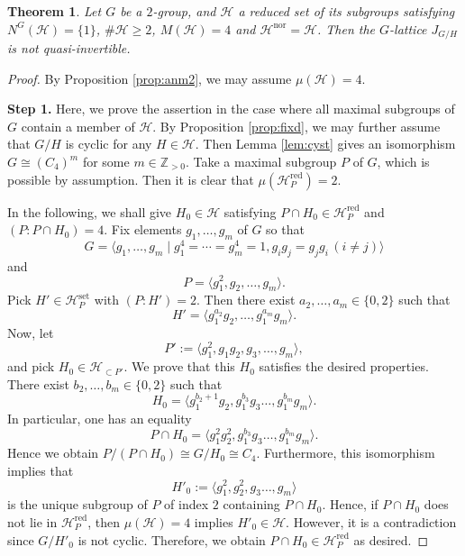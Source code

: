 \documentclass[12pt]{amsart}
\theoremstyle{plain}
\newtheorem{thm}{Theorem}[section]
\theoremstyle{definition}
\numberwithin{thm}{section}
\numberwithin{equation}{section}
\newcommand{\Zpn}{\mathbb{Z}_{>0}}
\newcommand{\cH}{\mathcal{H}}
\DeclareMathOperator{\red}{red}
\DeclareMathOperator{\nor}{nor}
\DeclareMathOperator{\set}{set}
\begin{document}
\begin{thm}\label{thm:ind2}
Let $G$ be a $2$-group, and $\cH$ a reduced set of its subgroups satisfying $N^{G}(\cH)=\{1\}$, $\#\cH \geq 2$, $M(\cH)=4$ and $\cH^{\nor}=\cH$. Then the $G$-lattice $J_{G/H}$ is not quasi-invertible. 
\end{thm}

\begin{proof}
By Proposition \ref{prop:anm2}, we may assume $\mu(\cH)=4$. 

\textbf{Step 1. }Here, we prove the assertion in the case where all maximal subgroups of $G$ contain a member of $\cH$. By Proposition \ref{prop:fixd}, we may further assume that $G/H$ is cyclic for any $H\in \cH$. Then Lemma \ref{lem:cyst} gives an isomorphism $G \cong (C_{4})^{m}$ for some $m\in \Zpn$. Take a maximal subgroup $P$ of $G$, which is possible by assumption. Then it is clear that $\mu(\cH_{P}^{\red})=2$. 

In the following, we shall give $H_{0}\in \cH$ satisfying $P\cap H_{0}\in \cH_{P}^{\red}$ and $(P:P\cap H_{0})=4$. Fix elements $g_{1},\ldots,g_{m}$ of $G$ so that
\begin{equation*}
G=\langle g_{1},\ldots,g_{m}\mid g_{1}^{4}=\cdots =g_{m}^{4}=1,g_{i}g_{j}=g_{j}g_{i}\,(i\neq j)\rangle
\end{equation*}
and 
\begin{equation*}
    P=\langle g_{1}^{2},g_{2},\ldots,g_{m}\rangle. 
\end{equation*}
Pick $H'\in \cH_{P}^{\set}$ with $(P:H')=2$. Then there exist $a_{2},\ldots,a_{m}\in \{0,2\}$ such that
\begin{equation*}
    H'=\langle g_{1}^{a_{2}}g_{2},\ldots,g_{1}^{a_{m}}g_{m}\rangle. 
\end{equation*}
Now, let
\begin{equation*}
    P':=\langle g_{1}^{2},g_{1}g_{2},g_{3},\ldots,g_{m}\rangle,
\end{equation*}
and pick $H_{0}\in \cH_{\subset P'}$. We prove that this $H_{0}$ satisfies the desired properties. There exist $b_{2},\ldots,b_{m}\in \{0,2\}$ such that
\begin{equation*}
    H_{0}=\langle g_{1}^{b_{2}+1}g_{2},g_{1}^{b_{3}}g_{3}\ldots,g_{1}^{b_{m}}g_{m}\rangle. 
\end{equation*}
In particular, one has an equality
\begin{equation*}
    P\cap H_{0}=\langle g_{1}^{2}g_{2}^{2},g_{1}^{b_{3}}g_{3}\ldots,g_{1}^{b_{m}}g_{m}\rangle. 
\end{equation*}
Hence we obtain $P/(P\cap H_{0})\cong G/H_{0}\cong C_{4}$. Furthermore, this isomorphism implies that
\begin{equation*}
    H'_{0}:=\langle g_{1}^{2},g_{2}^{2},g_{3}\ldots,g_{m}\rangle
\end{equation*}
is the unique subgroup of $P$ of index $2$ containing $P\cap H_{0}$. Hence, if $P\cap H_{0}$ does not lie in $\cH_{P}^{\red}$, then $\mu(\cH)=4$ implies $H'_{0}\in \cH$. However, it is a contradiction since $G/H'_{0}$ is not cyclic. Therefore, we obtain $P\cap H_{0}\in \cH_{P}^{\red}$ as desired.


\end{proof}
\end{document}
